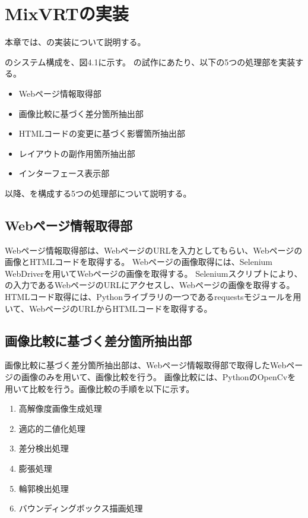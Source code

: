 \chapter{MixVRTの実装}\label{cha:Implementation}
本章では、\toolName の実装について説明する。


\toolName のシステム構成を、図4.1に示す。
\toolName の試作にあたり、以下の5つの処理部を実装する。
\begin{itemize}
    \item Webページ情報取得部
    \item 画像比較に基づく差分箇所抽出部
    \item HTMLコードの変更に基づく影響箇所抽出部
    \item レイアウトの副作用箇所抽出部
    \item インターフェース表示部
\end{itemize}
以降、\toolName を構成する5つの処理部について説明する。
\par



\section{Webページ情報取得部}\label{sec:Web_page_information_get_section}
Webページ情報取得部は、WebページのURLを入力としてもらい、Webページの画像とHTMLコードを取得する。
Webページの画像取得には、Selenium WebDriverを用いてWebページの画像を取得する。
Seleniumスクリプトにより、\toolName の入力であるWebページのURLにアクセスし、Webページの画像を取得する。
HTMLコード取得には、Pythonライブラリの一つであるrequestsモジュールを用いて、WebページのURLからHTMLコードを取得する。


\section{画像比較に基づく差分箇所抽出部}\label{sec:Difference_extraction_section}
画像比較に基づく差分箇所抽出部は、Webページ情報取得部で取得したWebページの画像のみを用いて、画像比較を行う。
画像比較には、PythonのOpenCvを用いて比較を行う。画像比較の手順を以下に示す。
\begin{enumerate}
    \item 高解像度画像生成処理
    \item 適応的二値化処理
    \item 差分検出処理
    \item 膨張処理
    \item 輪郭検出処理
    \item バウンディングボックス描画処理
\end{enumerate}

